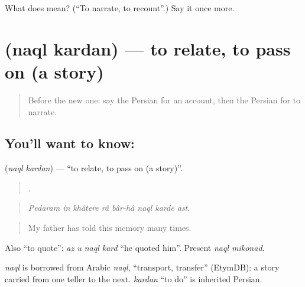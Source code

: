\begin{tcolorbox}[breakable,colback=teal!4,colframe=teal!35!black,title={Before you move on}]
What does   mean? (\textquotedblleft{}To narrate, to recount\textquotedblright{}.) Say it once more.
\end{tcolorbox}
\section[\texorpdfstring{\fa{نقل} \fa{کردن} (naql kardan)}{نقل کردن (naql kardan)}]{  (naql kardan) — to relate, to pass on (a story)}

\label{lesson:FA-C346-naql-kardan}



\begin{quote}
Before the new one: say the Persian for an account, then the Persian for to narrate.
\end{quote}

\subsection*{You'll want to know:  }
\textbf{ } (\emph{naql kardan}) — \textquotedblleft{}to relate, to pass on (a story)\textquotedblright{}.

\begin{quote}
       .
\end{quote}

\begin{quote}
\emph{Pedaram in khâtere râ bâr-hâ naql karde ast.}
\end{quote}

\begin{quote}
My father has told this memory many times.
\end{quote}

Also \textquotedblleft{}to quote\textquotedblright{}: \emph{az u naql kard} \textquotedblleft{}he quoted him\textquotedblright{}. Present \emph{naql mikonad}.

\begin{cousinweb}
\emph{naql} is borrowed from Arabic \emph{naql}, \textquotedblleft{}transport, transfer\textquotedblright{} (EtymDB): a story carried from one teller to the next. \emph{kardan} \textquotedblleft{}to do\textquotedblright{} is inherited Persian.
\end{cousinweb}

